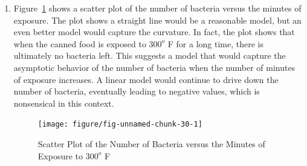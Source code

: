 \begin{solution}{2.22}
\begin{enumerate}
\item Figure~\ref{fig:simple:bact1} shows a scatter plot of the number of bacteria versus the minutes of exposure. The plot shows a straight line would be a reasonable model, but an even better model would capture the curvature. In fact, the plot shows that when the canned food is exposed to $300^{o}$ F for a long time, there is ultimately no bacteria left. This suggests a model that would capture the asymptotic behavior of the number of bacteria when the number of minutes of exposure increases. A linear model would continue to drive down the number of bacteria, eventually leading to negative values, which is nonsensical in this context.

\begin{figure}
\centering
\begin{knitrout}
\color{fgcolor}

{\centering \texttt{[image: figure/fig-unnamed-chunk-30-1]}

}



\end{knitrout}
\caption{Scatter Plot of the Number of Bacteria versus the Minutes of Exposure to $300^{o}$ F}
\label{fig:simple:bact1}
\end{figure}


\end{enumerate}
\end{solution}
